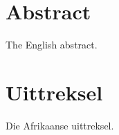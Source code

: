 \chapter*{Abstract}
\makeatletter{}\makeatother

The English abstract.



\chapter*{Uittreksel}
\makeatletter{}\makeatother

Die Afrikaanse uittreksel.

